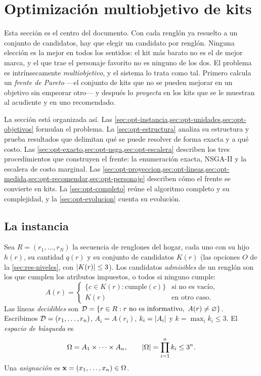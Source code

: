 \section{Optimización multiobjetivo de kits}
\label{sec:optimizacion}

Esta sección es el centro del documento. Con cada renglón ya resuelto a un
conjunto de candidatos, hay que elegir un candidato por renglón. Ninguna
elección es la mejor en todos los sentidos: el kit más barato no es el de
mejor marca, y el que trae el personaje favorito no es ninguno de los dos. El
problema es intrínsecamente \emph{multiobjetivo}, y el sistema lo trata como
tal. Primero calcula un \emph{frente de Pareto} ---el conjunto de kits que no
se pueden mejorar en un objetivo sin empeorar otro--- y después lo
\emph{proyecta} en los kits que se le muestran al acudiente y en uno
recomendado.

La sección está organizada así. Las \cref{sec:opt-instancia,sec:opt-unidades,sec:opt-objetivos}
formulan el problema. La \cref{sec:opt-estructura} analiza su estructura y
prueba resultados que delimitan qué se puede resolver de forma exacta y a qué
costo. Las \cref{sec:opt-exacto,sec:opt-nsga,sec:opt-escalera} describen los
tres procedimientos que construyen el frente: la enumeración exacta, NSGA-II
y la escalera de costo marginal. Las
\cref{sec:opt-proyeccion,sec:opt-lineas,sec:opt-medida,sec:opt-recomendar,sec:opt-personaje}
describen cómo el frente se convierte en kits. La \cref{sec:opt-completo}
reúne el algoritmo completo y su complejidad, y la \cref{sec:opt-evolucion}
cuenta su evolución.

\subsection{La instancia}
\label{sec:opt-instancia}

\begin{definicion}
\label{def:instancia}
Sea $R=(r_1,\dots,r_N)$ la secuencia de renglones del hogar, cada uno con su
hijo $h(r)$, su cantidad $q(r)$ y su conjunto de candidatos $K(r)$
(las opciones $O$ de la \cref{sec:res-niveles}, con $\left\lvert K(r) \right\rvert\leq3$). Los
candidatos \emph{admisibles} de un renglón son los que cumplen los atributos
impuestos, o todos si ninguno cumple:
\[
  A(r)=\begin{cases}\{c\in K(r):\mathrm{cumple}(c)\} & \text{si no es vacío,}\\
  K(r) & \text{en otro caso.}\end{cases}
\]
Las líneas \emph{decidibles} son
$\Dec=\{r\in R : r \text{ no es informativo},\ A(r)\neq\varnothing\}$.
Escribimos $\mathcal{D}=(r_1,\dots,r_n)$, $A_i=A(r_i)$, $k_i=\left\lvert A_i \right\rvert$ y
$k=\max_i k_i\leq3$. El \emph{espacio de búsqueda} es
\[
  \Omega=A_1\times\cdots\times A_n,\qquad \left\lvert \Omega \right\rvert=\prod_{i=1}^n k_i\leq 3^n.
\]
Una \emph{asignación} es $\mathbf{x}=(x_1,\dots,x_n)\in\Omega$.
\end{definicion}

